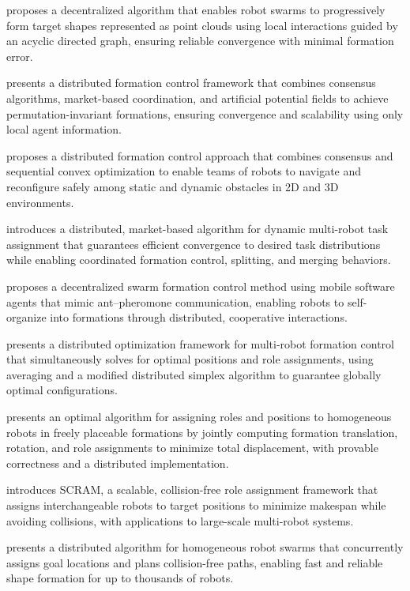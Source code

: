 \cite{li2019decentralized} proposes a decentralized algorithm that enables robot swarms to progressively form target shapes represented as point clouds using local interactions guided by an acyclic directed graph, ensuring reliable convergence with minimal formation error.

\cite{zavlanos2007distributed} presents a distributed formation control framework that combines consensus algorithms, market-based coordination, and artificial potential fields to achieve permutation-invariant formations, ensuring convergence and scalability using only local agent information.

\cite{alonso2016distributed} proposes a distributed formation control approach that combines consensus and sequential convex optimization to enable teams of robots to navigate and reconfigure safely among static and dynamic obstacles in 2D and 3D environments.

\cite{michael2008distributed} introduces a distributed, market-based algorithm for dynamic multi-robot task assignment that guarantees efficient convergence to desired task distributions while enabling coordinated formation control, splitting, and merging behaviors.

\cite{kambayashi2018distributed} proposes a decentralized swarm formation control method using mobile software agents that mimic ant–pheromone communication, enabling robots to self-organize into formations through distributed, cooperative interactions.

\cite{montijano2014efficient} presents a distributed optimization framework for multi-robot formation control that simultaneously solves for optimal positions and role assignments, using averaging and a modified distributed simplex algorithm to guarantee globally optimal configurations.

\cite{mosteo2017optimal} presents an optimal algorithm for assigning roles and positions to homogeneous robots in freely placeable formations by jointly computing formation translation, rotation, and role assignments to minimize total displacement, with provable correctness and a distributed implementation.

\cite{macalpine2015scram} introduces SCRAM, a scalable, collision-free role assignment framework that assigns interchangeable robots to target positions to minimize makespan while avoiding collisions, with applications to large-scale multi-robot systems.

\cite{wang2020shape} presents a distributed algorithm for homogeneous robot swarms that concurrently assigns goal locations and plans collision-free paths, enabling fast and reliable shape formation for up to thousands of robots.

